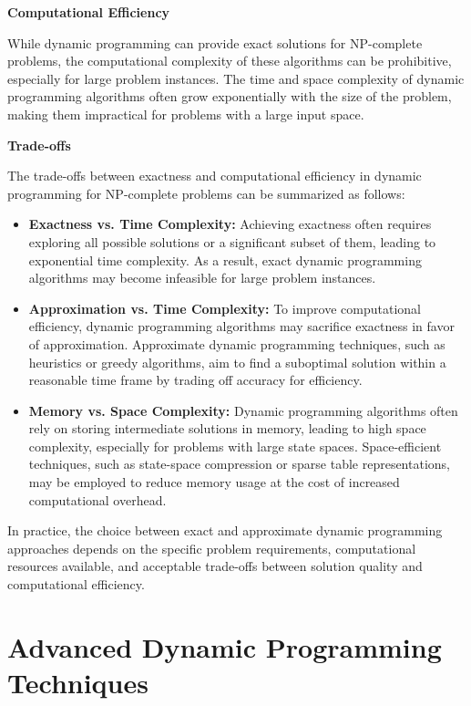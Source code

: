 \documentclass[12pt]{book} %
\begin{document}
\textbf{Computational Efficiency}

While dynamic programming can provide exact solutions for NP-complete problems, the computational complexity of these algorithms can be prohibitive, especially for large problem instances. The time and space complexity of dynamic programming algorithms often grow exponentially with the size of the problem, making them impractical for problems with a large input space.

\textbf{Trade-offs}

The trade-offs between exactness and computational efficiency in dynamic programming for NP-complete problems can be summarized as follows:

\begin{itemize}
    \item \textbf{Exactness vs. Time Complexity:} Achieving exactness often requires exploring all possible solutions or a significant subset of them, leading to exponential time complexity. As a result, exact dynamic programming algorithms may become infeasible for large problem instances.
    
    \item \textbf{Approximation vs. Time Complexity:} To improve computational efficiency, dynamic programming algorithms may sacrifice exactness in favor of approximation. Approximate dynamic programming techniques, such as heuristics or greedy algorithms, aim to find a suboptimal solution within a reasonable time frame by trading off accuracy for efficiency.
    
    \item \textbf{Memory vs. Space Complexity:} Dynamic programming algorithms often rely on storing intermediate solutions in memory, leading to high space complexity, especially for problems with large state spaces. Space-efficient techniques, such as state-space compression or sparse table representations, may be employed to reduce memory usage at the cost of increased computational overhead.
\end{itemize}

In practice, the choice between exact and approximate dynamic programming approaches depends on the specific problem requirements, computational resources available, and acceptable trade-offs between solution quality and computational efficiency.


\section{Advanced Dynamic Programming Techniques}
\end{document}
